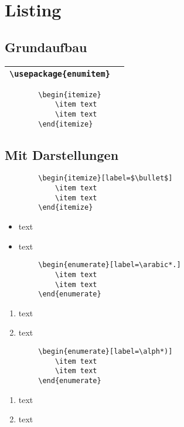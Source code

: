 \section{Listing}

    \subsection{Grundaufbau}

    \begin{tabular}{|p{}|p{}|}
        \hline
        \texttt{\textbackslash usepackage\{enumitem\}} &  \\
        \hline
    \end{tabular}

    \begin{verbatim}
        \begin{itemize}
            \item text
            \item text
        \end{itemize}
    \end{verbatim}

    \subsection{Mit Darstellungen}
    \begin{verbatim}
        \begin{itemize}[label=$\bullet$]
            \item text
            \item text
        \end{itemize}
    \end{verbatim}

    \begin{itemize}[label=$\bullet$]
        \item text
        \item text
    \end{itemize}


    \begin{verbatim}
        \begin{enumerate}[label=\arabic*.]
            \item text
            \item text
        \end{enumerate}
    \end{verbatim}

    \begin{enumerate}[label=\arabic*.]
        \item text
        \item text
    \end{enumerate}

    \begin{verbatim}
        \begin{enumerate}[label=\alph*)]
            \item text
            \item text
        \end{enumerate}
    \end{verbatim}
    
    \begin{enumerate}[label=\alph*)]
        \item text
        \item text
    \end{enumerate}